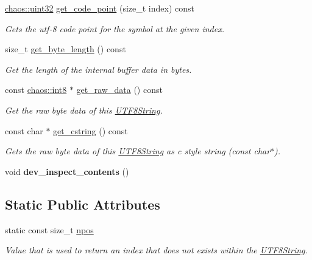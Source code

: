 \begin{DoxyCompactItemize}
\hyperlink{namespacechaos_a3b3a47ba1e284655bf1a30c441121c60}{chaos\+::uint32} \hyperlink{classchaos_1_1str_1_1_u_t_f8_string_a007889a60f57ec9196dcebb39abeafdf}{get\+\_\+code\+\_\+point} (size\+\_\+t index) const 
\begin{DoxyCompactList}\small\item\em Gets the utf-\/8 code point for the symbol at the given index. \end{DoxyCompactList}\item 
size\+\_\+t \hyperlink{classchaos_1_1str_1_1_u_t_f8_string_a9312a6aac333d68a87066d6f222d119a}{get\+\_\+byte\+\_\+length} () const 
\begin{DoxyCompactList}\small\item\em Get the length of the internal buffer data in bytes. \end{DoxyCompactList}\item 
const \hyperlink{namespacechaos_a56015674cfe4ad1fc583c3da6c724d8a}{chaos\+::int8} $\ast$ \hyperlink{classchaos_1_1str_1_1_u_t_f8_string_a6424b00b21c9c6600818808c225fe381}{get\+\_\+raw\+\_\+data} () const 
\begin{DoxyCompactList}\small\item\em Get the raw byte data of this \hyperlink{classchaos_1_1str_1_1_u_t_f8_string}{U\+T\+F8\+String}. \end{DoxyCompactList}\item 
const char $\ast$ \hyperlink{classchaos_1_1str_1_1_u_t_f8_string_ae04d6b4dc8a6c4cbebb2679ed7658805}{get\+\_\+cstring} () const 
\begin{DoxyCompactList}\small\item\em Gets the raw byte data of this \hyperlink{classchaos_1_1str_1_1_u_t_f8_string}{U\+T\+F8\+String} as c style string (const char$\ast$). \end{DoxyCompactList}\item 
\hypertarget{classchaos_1_1str_1_1_u_t_f8_string_a28cdd164c2611809fb191764b6734a03}{}void {\bfseries dev\+\_\+inspect\+\_\+contents} ()\label{classchaos_1_1str_1_1_u_t_f8_string_a28cdd164c2611809fb191764b6734a03}

\end{DoxyCompactItemize}
\subsection*{Static Public Attributes}
\begin{DoxyCompactItemize}
\item 
\hypertarget{classchaos_1_1str_1_1_u_t_f8_string_a7e301ebfad4cd1b14e3a13cb0595b43b}{}static const size\+\_\+t \hyperlink{classchaos_1_1str_1_1_u_t_f8_string_a7e301ebfad4cd1b14e3a13cb0595b43b}{npos}\label{classchaos_1_1str_1_1_u_t_f8_string_a7e301ebfad4cd1b14e3a13cb0595b43b}

\begin{DoxyCompactList}\small\item\em Value that is used to return an index that does not exists within the \hyperlink{classchaos_1_1str_1_1_u_t_f8_string}{U\+T\+F8\+String}. \end{DoxyCompactList}\end{DoxyCompactItemize}


